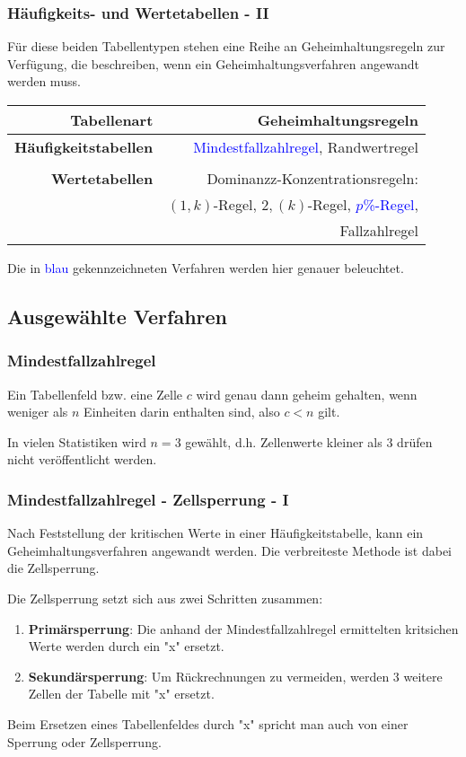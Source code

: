 \documentclass[aspectratio=169]{beamer}
\begin{document}
\begin{frame}
    \frametitle{Häufigkeits- und Wertetabellen - II}
    Für diese beiden Tabellentypen stehen eine Reihe an Geheimhaltungsregeln zur Verfügung, die beschreiben, wenn ein Geheimhaltungsverfahren angewandt werden muss.
    \begin{center}
        \begin{tabular}{ r r }
         \textbf{Tabellenart} \vline & \textbf{Geheimhaltungsregeln} \\ 
         \hline
         \textbf{Häufigkeitstabellen} \vline & \textcolor{blue}{Mindestfallzahlregel}, Randwertregel \\  
         \vline & \\
         \hline
         \textbf{Wertetabellen} \vline & Dominanzz-Konzentrationsregeln:  \\
         \vline & $(1,k)$-Regel, $2,(k)$-Regel, \textcolor{blue}{$p$\%-Regel}, \\
         \vline & Fallzahlregel
        \end{tabular}
    \end{center}
    Die in \textcolor{blue}{blau} gekennzeichneten Verfahren werden hier genauer beleuchtet.
\end{frame}


\subsection{Ausgewählte Verfahren}

\begin{frame}
    \frametitle{Mindestfallzahlregel}
    \begin{theorem}[Mindestfallzahlregel]
        Ein Tabellenfeld bzw. eine Zelle $c$ wird genau dann geheim gehalten, wenn weniger als $n$ Einheiten darin enthalten sind, also $c < n$ gilt.
    \end{theorem}
    In vielen Statistiken wird $n = 3$ gewählt, d.h. Zellenwerte kleiner als $3$ drüfen nicht veröffentlicht werden.
\end{frame}


\begin{frame}
    \frametitle{Mindestfallzahlregel - Zellsperrung - I}
    Nach Feststellung der kritischen Werte in einer Häufigkeitstabelle, kann ein Geheimhaltungsverfahren angewandt werden. Die verbreiteste Methode ist dabei die Zellsperrung.
    \begin{theorem}[Zellsperrung]
        Die Zellsperrung setzt sich aus zwei Schritten zusammen:
        \begin{enumerate}
            \item \textbf{Primärsperrung}: Die anhand der Mindestfallzahlregel ermittelten kritsichen Werte werden durch ein "x" ersetzt.
            \item \textbf{Sekundärsperrung}: Um Rückrechnungen zu vermeiden, werden 3 weitere Zellen der Tabelle mit "x" ersetzt.
        \end{enumerate}
    \end{theorem}
    Beim Ersetzen eines Tabellenfeldes durch "x" spricht man auch von einer Sperrung oder Zellsperrung.
\end{frame}
\end{document}

